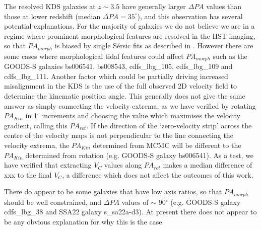 \documentclass[fleqn,usenatbib]{mn2e}
\newcommand{\Sers}{S\'{e}rsic }
\begin{document}
The resolved KDS galaxies at $z \sim 3.5$ have generally larger $\Delta PA$ values than those at lower redshift (median $\Delta PA = 35^{\circ}$), and this observation has several potential explanations.
For the majority of galaxies we do not believe we are in a regime where prominent morphological features are resolved in the HST imaging, so that $PA_{morph}$ is biased by single \Sers fits as described in \cite{Rodrigues2016}.
However there are some cases where morphological tidal features could affect $PA_{morph}$ such as the GOODS-S galaxies bs006541, bs008543, cdfs\_lbg\_105, cdfs\_lbg\_109 and cdfs\_lbg\_111.
Another factor which could be partially driving increased misalignment in the KDS is the use of the full observed 2D velocity field to determine the kinematic position angle.
This generally does not give the same answer as simply connecting the velocity extrema, as we have verified by rotating $PA_{Kin}$ in 1$^{\circ}$ increments and choosing the value which maximises the velocity gradient, calling this $PA_{rot}$.
If the direction of the `zero-velocity strip' across the centre of the velocity maps is not perpendicular to the line connecting the velocity extrema, the $PA_{Kin}$ determined from MCMC will be different to the $PA_{Kin}$ determined from rotation (e.g. GOODS-S galaxy bs006541).
As a test, we have verified that extracting $V_{C}$ values along $PA_{rot}$ makes a median difference of xxx to the final $V_{C}$, a difference which does not affect the outcomes of this work.

There do appear to be some galaxies that have low axis ratios, so that $PA_{morph}$ should be well constrained, and $\Delta PA$ values of $\sim$ 90$^{\circ}$ (e.g. GOODS-S galaxy cdfs\_lbg\_38 and SSA22 galaxy s\_sa22a-d3).
At present there does not appear to be any obvious explanation for why this is the case.
\end{document}
